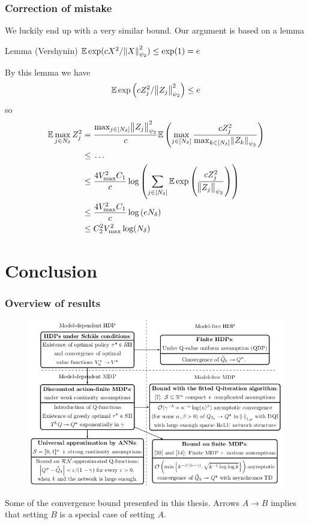 \documentclass{beamer}[10]
\begin{document}
\begin{frame}
  \frametitle{Correction of mistake}
  \begingroup \tiny
  We luckily end up 
  with a very similar bound.
  Our argument is based on a lemma
  \begin{block}{Lemma (Vershynin)}
    $\mathbb{E} \exp(c X^2 / \norm{X}_{\psi_2}^2) \leq \exp(1) = e$
  \end{block}
  By this lemma we have
  \begin{equation*}
    \mathbb{E} \exp \left(c Z_j^2/\norm{Z_j}_{\psi_2}^2 \right) \leq e
  \end{equation*}
  so
  \begin{align*}
    \mathbb{E} \max_{j \in N_\delta} Z_j^2
    = &\; \frac{\max_{j \in [N_\delta]} \norm{Z_j}_{\psi_2}^2}{c}
    \mathbb{E} \left( \max_{j \in [N_\delta]} \frac{  c Z_j^2 } 
    {\max_{k \in [N_\delta]} \norm{Z_k}_{\psi_2}} \right)
    \\ \leq &\; \dots
    \\ \leq &\; \frac{4 V_{\max}^2 C_1}{c}
    \log \left( \sum_{j \in [N_\delta]} \mathbb{E} \exp \left( \frac{  c Z_j^2 } 
    {\norm{Z_j}_{\psi_2}} \right) \right)
    \\ \leq &\; \frac{4 V_{\max}^2 C_1}{c}
    \log \left( e N_\delta \right)
    \\ \leq &\; C_2^2 V_{\max}^2 \log(N_\delta)
  \end{align*}
  \endgroup
\end{frame}

\section{Conclusion}

\begin{frame}[fragile]
  \frametitle{Overview of results}
  \begingroup \scriptsize
  \begin{figure}
    \includegraphics[scale=0.43]{figs/overview.png}
  \end{figure}
  \vspace{-0.3cm}
  Some of the convergence bound presented in this thesis.
      Arrows $A \to B$ implies that setting $B$ is a special
    case of setting $A$.
  \endgroup
\end{frame}
\end{document}
